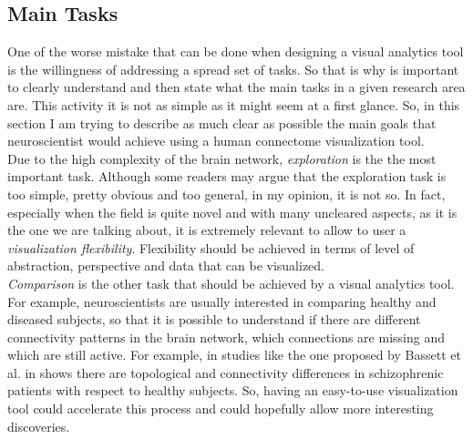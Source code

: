 \documentclass{article}
\begin{document}
\begin{multicols}{2}
\section{Main Tasks}
One of the worse mistake that can be done when designing a visual analytics tool is the willingness of addressing a spread set of tasks. So that is why is important to clearly understand and then state what the main tasks in a given research area are. This activity it is not as simple as it might seem at a first glance. So, in this section I am trying to describe as much clear as possible the main goals that neuroscientist would achieve using a human connectome visualization tool.\\
Due to the high complexity of the brain network, \textit{exploration} is the the most important task. Although some readers may argue that the exploration task is too simple, pretty obvious and too general, in my opinion, it is not so. In fact, especially when the field is quite novel and with many uncleared aspects, as it is the one we are talking about, it is extremely relevant to allow to user a \textit{visualization flexibility}. Flexibility should be achieved in terms of level of abstraction, perspective and data that can be visualized. \\
\textit{Comparison} is the other task that should be achieved by a visual analytics tool. For example, neuroscientists are usually interested in comparing healthy and diseased subjects, so that it is possible to understand if there are different connectivity patterns in the brain network, which connections are missing and which are still active. For example, in studies like the one proposed by Bassett et al. in \cite{hierarchicalOrganization} shows there are topological and connectivity differences in schizophrenic patients with respect to healthy subjects. So, having an easy-to-use visualization tool could accelerate this process and could hopefully allow more interesting discoveries.


\end{multicols}
\end{document}
